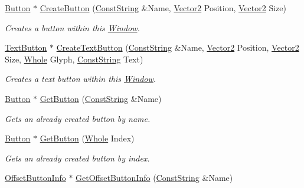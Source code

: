 \begin{DoxyCompactItemize}
\hyperlink{classphys_1_1UI_1_1Button}{Button} $\ast$ \hyperlink{classphys_1_1UI_1_1Window_a022f3d02aa8d99cb6d8abccddbc9e662}{CreateButton} (\hyperlink{namespacephys_a5ce5049f8b4bf88d6413c47b504ebb31}{ConstString} \&Name, \hyperlink{classphys_1_1Vector2}{Vector2} Position, \hyperlink{classphys_1_1Vector2}{Vector2} Size)
\begin{DoxyCompactList}\small\item\em Creates a button within this \hyperlink{classphys_1_1UI_1_1Window}{Window}. \item\end{DoxyCompactList}\item 
\hyperlink{classphys_1_1UI_1_1TextButton}{TextButton} $\ast$ \hyperlink{classphys_1_1UI_1_1Window_aa4b5e6287496b6a47728ce9bde53ad90}{CreateTextButton} (\hyperlink{namespacephys_a5ce5049f8b4bf88d6413c47b504ebb31}{ConstString} \&Name, \hyperlink{classphys_1_1Vector2}{Vector2} Position, \hyperlink{classphys_1_1Vector2}{Vector2} Size, \hyperlink{namespacephys_a460f6bc24c8dd347b05e0366ae34f34a}{Whole} Glyph, \hyperlink{namespacephys_a5ce5049f8b4bf88d6413c47b504ebb31}{ConstString} Text)
\begin{DoxyCompactList}\small\item\em Creates a text button within this \hyperlink{classphys_1_1UI_1_1Window}{Window}. \item\end{DoxyCompactList}\item 
\hyperlink{classphys_1_1UI_1_1Button}{Button} $\ast$ \hyperlink{classphys_1_1UI_1_1Window_ab1152992cf6b636c8a4911889d930d9a}{GetButton} (\hyperlink{namespacephys_a5ce5049f8b4bf88d6413c47b504ebb31}{ConstString} \&Name)
\begin{DoxyCompactList}\small\item\em Gets an already created button by name. \item\end{DoxyCompactList}\item 
\hyperlink{classphys_1_1UI_1_1Button}{Button} $\ast$ \hyperlink{classphys_1_1UI_1_1Window_aba0c70a91112b87383f83c86784ce7cd}{GetButton} (\hyperlink{namespacephys_a460f6bc24c8dd347b05e0366ae34f34a}{Whole} Index)
\begin{DoxyCompactList}\small\item\em Gets an already created button by index. \item\end{DoxyCompactList}\item 
\hyperlink{structphys_1_1UI_1_1ResizingInfo}{OffsetButtonInfo} $\ast$ \hyperlink{classphys_1_1UI_1_1Window_ad0d6b12c2f69ea1bc580bba7e69949a5}{GetOffsetButtonInfo} (\hyperlink{namespacephys_a5ce5049f8b4bf88d6413c47b504ebb31}{ConstString} \&Name)

\end{DoxyCompactItemize}
